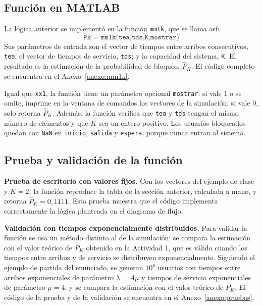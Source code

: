 \documentclass[12pt]{article}
\begin{document}
\subsection{Función en MATLAB}

La lógica anterior se implementó en la función \texttt{mm1k}, que se llama así:
\[
\texttt{Pk = mm1k(tea,tds,K,mostrar)}
\]
Sus parámetros de entrada son el vector de tiempos entre arribos consecutivos, \texttt{tea}; el vector de tiempos de servicio, \texttt{tds}; y la capacidad del sistema, \texttt{K}. El resultado es la estimación de la probabilidad de bloqueo, $\hat{P}_K$. El código completo se encuentra en el Anexo~\ref{anexo:mm1k}.

Igual que \texttt{xx1}, la función tiene un parámetro opcional \texttt{mostrar}: si vale 1 o se omite, imprime en la ventana de comandos los vectores de la simulación; si vale 0, solo retorna $\hat{P}_K$. Además, la función verifica que \texttt{tea} y \texttt{tds} tengan el mismo número de elementos y que $K$ sea un entero positivo. Los usuarios bloqueados quedan con \texttt{NaN} en \texttt{inicio}, \texttt{salida} y \texttt{espera}, porque nunca entran al sistema.

\subsection{Prueba y validación de la función}

\textbf{Prueba de escritorio con valores fijos.} Con los vectores del ejemplo de clase y $K=2$, la función reproduce la tabla de la sección anterior, calculada a mano, y retorna $\hat{P}_K=0{,}1111$. Esta prueba muestra que el código implementa correctamente la lógica planteada en el diagrama de flujo.

\textbf{Validación con tiempos exponencialmente distribuidos.} Para validar la función se usa un método distinto al de la simulación: se compara la estimación con el valor teórico de $P_K$ obtenido en la Actividad 1, que es válido cuando los tiempos entre arribos y de servicio se distribuyen exponencialmente. Siguiendo el ejemplo de partida del enunciado, se generan $10^6$ usuarios con tiempos entre arribos exponenciales de parámetro $\lambda=A\mu$ y tiempos de servicio exponenciales de parámetro $\mu=4$, y se compara la estimación con el valor teórico de $P_K$. El código de la prueba y de la validación se encuentra en el Anexo~\ref{anexo:pruebas}.
\end{document}
